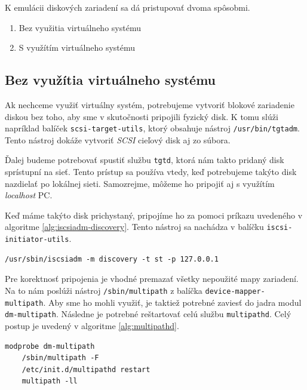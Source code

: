 K emulácii diskových zariadení sa dá pristupovať dvoma spôsobmi. 

\begin{enumerate}
    \item Bez využitia virtuálneho systému \label{item:without-virt-system}
    \item S využítím virtuálneho systému \label{item:with-virt-system}
\end{enumerate}

%
%

\subsection{Bez využítia virtuálneho systému}

Ak nechceme využiť virtuálny systém, potrebujeme vytvoriť blokové zariadenie
diskou bez toho, aby sme v skutočnosti pripojili fyzický disk. K tomu slúži
napríklad balíček \texttt{scsi-target-utils}, ktorý obsahuje nástroj
\texttt{/usr/bin/tgtadm}.  Tento nástroj dokáže vytvoriť \emph{SCSI} cieľový
disk aj zo súbora. 

Ďalej budeme potrebovať spustiť službu \texttt{tgtd}, ktorá nám takto pridaný
disk sprístupní na sieť. Tento prístup sa používa vtedy, keď potrebujeme takýto
disk nazdielať po lokálnej sieti. Samozrejme, môžeme ho pripojiť aj s využítím
\emph{localhost} PC.

Keď máme takýto disk prichystaný, pripojíme ho za pomoci príkazu uvedeného v
algoritme \ref{alg:iscsiadm-discovery}. Tento nástroj sa nachádza v balíčku
\texttt{iscsi-initiator-utils}.
\\
\begin{lstlisting}[caption=Vyhľadávanie diskov na sieti pomocou iscsiadm,label=alg:iscsiadm-discovery]
    /usr/sbin/iscsiadm -m discovery -t st -p 127.0.0.1
\end{lstlisting}

Pre korektnosť pripojenia je vhodné premazať všetky nepoužité mapy zariadení.
Na to nám poslúži nástroj \texttt{/sbin/multipath} z balíčka
\texttt{device-mapper-multipath}. Aby sme ho mohli využiť, je taktiež potrebné
zaviesť do jadra modul \texttt{dm-multipath}. Následne je potrebné reštartovať celú
službu \texttt{multipathd}. Celý postup je uvedený v algoritme
\ref{alg:multipathd}.
\\
\begin{lstlisting}[label=alg:multipathd,caption=Vyhľadanie zariadení pomocou multipathd]
    modprobe dm-multipath
    /sbin/multipath -F
    /etc/init.d/multipathd restart
    multipath -ll
\end{lstlisting}

